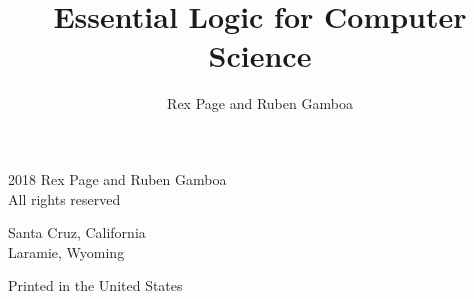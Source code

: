 \title{Essential Logic for Computer Science}
\author{Rex Page and Ruben Gamboa}








\titlepage


\begin{copyrightpage}
\textcopyright{} 2018 Rex Page and Ruben Gamboa \\
All rights reserved

Santa Cruz, California\\
Laramie, Wyoming

Printed in the United States
\end{copyrightpage}

\dedication{To Lucy Saarni, artist and philosopher \\--- Rex \\[2em]
and \\[2em]
To Mona Gamboa and the kids, who enrich life and laugh, sometimes, at logic jokes \\--- Ruben} 

\tableofcontents

